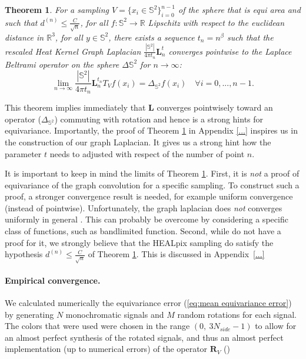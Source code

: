 \documentclass{article} %
\newtheorem{theorem}{Theorem}[section]
\renewcommand{\b}[1]{{\bm{#1}}}   %
\begin{document}
\begin{theorem}
	For a sampling $V = \{x_i\in\mathbb S^2\}_{i=0}^{n-1}$ of the sphere that is equi area and such that $d^{(n)} \leq \frac{C}{\sqrt{n}}$, for all $f: \mathbb S^2 \rightarrow \mathbb R$ Lipschitz with respect to the euclidean distance in $\mathbb R^3$, for all $y\in\mathbb S^2$, there exists a sequence $t_n = n^\beta$ such that the rescaled Heat Kernel Graph Laplacian $\frac{|\mathbb S^2|}{4\pi t_n}\b {L}^t_n$ converges pointwise to the Laplace Beltrami operator on the sphere $\Delta{\mathbb S^2}$  for $n\to\infty$:
	$$ \lim_{n\to\infty} \frac{|\mathbb{S}^2|}{4\pi t_n} \b{L}_n^{t_n} T_V f(x_i) =  \Delta_{\mathbb{S}^2}f(x_i)\quad \forall i=0, ..., n-1.$$
	\label{theo:pointwise convergence for a regular sampling}
\end{theorem}
This theorem implies immediately that $\b{L}$ converges pointwisely toward an operator ($\Delta_{\mathbb S^2}$) commuting with rotation and hence is a strong hints for equivariance.
Importantly, the proof of Theorem \ref{theo:pointwise convergence for a regular sampling} in Appendix \ref{...} inspires us in the construction of our graph Laplacian. It gives us a strong hint how the parameter $t$ needs to adjusted with respect of the number of point $n$.

It is important to keep in mind the limits of Theorem \ref{theo:pointwise convergence for a regular sampling}.
First, it is \emph{not} a proof of equivariance of the graph convolution for a specific sampling. To construct such a proof, a stronger convergence result is needed, for example uniform convergence (instead of pointwise).
Unfortunately, the graph laplacian does \emph{not} converges uniformly in general \cite{belkin2007convergence}. This can probably be overcome by considering a specific class of functions, such as bandlimited function.
Second, while do not have a proof for it, we strongly believe that the HEALpix sampling do satisfy the hypothesis $d^{(n)}\leq \frac{C}{\sqrt{n}}$ of Theorem \ref{theo:pointwise convergence for a regular sampling}. This is discussed in Appendix~\ref{...}


\paragraph{Empirical convergence.}

We calculated numerically the equivariance error (\ref{eq:mean equivariance error}) by generating $N$ monochromatic signals and $M$ random rotations for each signal. The colors that were used were chosen in the range $(0,\  3N_{side}-1)$ to allow for an almost perfect synthesis of the rotated signals, and thus an almost perfect implementation (up to numerical errors) of the operator $\b{R}_V$ (\cite{healpix_primer})
\end{document}
